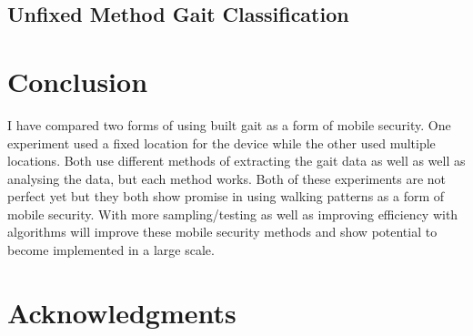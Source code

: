\documentclass{sig-alternate}
\begin{document}
\subsection{Unfixed Method Gait Classification}


\section{Conclusion}
I have compared two forms of using built gait as a form of mobile security. One experiment used a fixed location for the device while the other used multiple locations. Both use different methods of extracting the gait data as well as well as analysing the data, but each method works. Both of these experiments are not perfect yet but they both show promise in using walking patterns as a form of mobile security. With more sampling/testing as well as improving efficiency with algorithms will improve these mobile security methods and show potential to become implemented in a large scale. 

\section{Acknowledgments}

  
\end{document}
